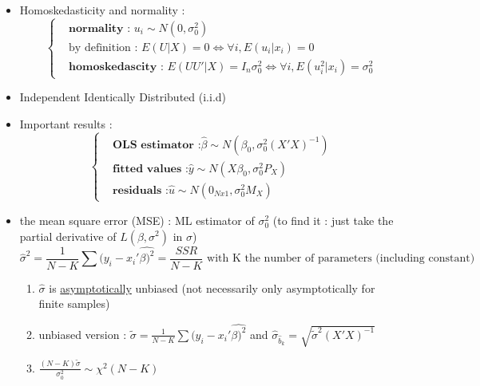 \documentclass{article}
\begin{document}
\begin{errorbox}
\begin{itemize}
    \item Homoskedasticity and normality : 
    \begin{equation}
    \left\{
    \begin{aligned}
        &\textbf{normality : } u_i \sim N(0,\sigma_0^2) \\
        &\text{by definition : }E(U|X)=0 \Longleftrightarrow \forall i, E(u_i|x_i) = 0\\
        &\textbf{homoskedascity : } E(UU'|X) = I_n\sigma_0^2 \Longleftrightarrow \forall i, E(u_i^2|x_i) = \sigma_0^2
    \end{aligned}
    \right.
    \end{equation}
    \item Independent Identically Distributed (i.i.d)
    \item Important results : 
    \begin{equation}
    \left\{
    \begin{aligned}
        &\textbf{OLS estimator :} \hat{\beta} \sim N(\beta_0,\sigma_0^2(X'X)^{-1})\\
        &\textbf{fitted values :}\hat{y} \sim N(X\beta_0, \sigma_0^2P_X)\\
        &\textbf{residuals :}\hat{u}\sim N(0_{Nx1},\sigma_0^2M_X)
    \end{aligned}
    \right.
    \end{equation}
    \item the mean square error (MSE) : ML estimator of $\sigma_0^2$ (to find it : just take the partial derivative of $L(\beta,\sigma^2)$ in $\sigma$)
    \begin{equation}
        \hat{\sigma}^2 = \frac{1}{N-K}\sum(y_i-x_i'\hat{\beta)^2} = \frac{SSR}{N-K} \text{ with K the number of parameters (including constant)}
    \end{equation} 
    \begin{enumerate}
        \item $\hat{\sigma}$ is \underline{asymptotically} unbiased (not necessarily only asymptotically for finite samples)
        \item unbiased version  : $\tilde{\sigma}=\frac{1}{N-K}\sum(y_i-x_i'\hat{\beta)^2}$ and $\hat{\sigma}_{\hat{b}_k} = \sqrt{\tilde{\sigma}^2(X'X)^{-1}}$
        \item $\frac{(N-K)\tilde{\sigma}}{\sigma_0^2}\sim \chi^2(N-K)$
    \end{enumerate}
\end{itemize}
\end{errorbox}
\end{document}
